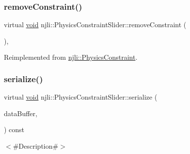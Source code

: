 \mbox{\label{classnjli_1_1_physics_constraint_slider_a86bb3a2cb9397577d6f4003c1ff9a2b2}} 
\subsubsection{\texorpdfstring{remove\+Constraint()}{removeConstraint()}}
{\footnotesize\ttfamily virtual \mbox{\hyperlink{_thread_8h_af1e856da2e658414cb2456cb6f7ebc66}{void}} njli\+::\+Physics\+Constraint\+Slider\+::remove\+Constraint (\begin{DoxyParamCaption}{ }\end{DoxyParamCaption})\hspace{0.3cm}{\ttfamily [protected]}, {\ttfamily [virtual]}}



Reimplemented from \mbox{\hyperlink{classnjli_1_1_physics_constraint_ae3dc487da3069d859bb4ddb05aa2e779}{njli\+::\+Physics\+Constraint}}.

\mbox{\label{classnjli_1_1_physics_constraint_slider_ab29e0ae4cc45af8ac95cfe8052f1ed48}} 
\subsubsection{\texorpdfstring{serialize()}{serialize()}}
{\footnotesize\ttfamily virtual \mbox{\hyperlink{_thread_8h_af1e856da2e658414cb2456cb6f7ebc66}{void}} njli\+::\+Physics\+Constraint\+Slider\+::serialize (\begin{DoxyParamCaption}\item[{\mbox{\hyperlink{_thread_8h_af1e856da2e658414cb2456cb6f7ebc66}{void}} $\ast$}]{data\+Buffer,  }\item[{bt\+Serializer $\ast$}]{ }\end{DoxyParamCaption}) const\hspace{0.3cm}{\ttfamily [virtual]}}



$<$\#\+Description\#$>$ 

